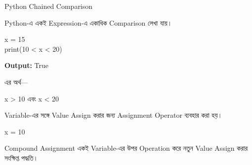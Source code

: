 \begin{examplebox}{Python Chained Comparison}

Python-এ একই Expression-এ একাধিক Comparison লেখা যায়।

\begin{codebox}
\begin{english}
\ttfamily
x = 15\\
print(10 < x < 20)
\end{english}
\end{codebox}

\textbf{Output:}
\textenglish{\ttfamily True}

এর অর্থ—

\begin{center}

\textenglish{\ttfamily x > 10}
\qquad এবং \qquad
\textenglish{\ttfamily x < 20}

\end{center}

\end{examplebox}



Variable-এর সঙ্গে Value Assign করার জন্য
Assignment Operator ব্যবহার করা হয়।

\begin{codebox}
\begin{english}
\ttfamily
x = 10
\end{english}
\end{codebox}

Compound Assignment একই Variable-এর উপর Operation করে
নতুন Value Assign করার সংক্ষিপ্ত পদ্ধতি।

